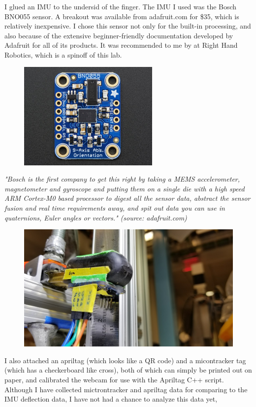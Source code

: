 \documentclass[preprint,12pt,3p]{elsarticle}
\begin{document}
I glued an IMU to the undersid of the finger. The IMU I used was the Bosch BNO055 sensor. A breakout
was available from adafruit.com for \$35, which is relatively inexpensive.  I chose this sensor not
only for the built-in processing, and also because of the extensive beginner-friendly documentation
developed by Adafruit for all of its products. It was recommended to me by 
at Right Hand Robotics, which is a spinoff of this lab.

\begin{figure}[H]
\centering
\includegraphics[width=.3\textwidth]{images/setup/bno055.png}
\end{figure}

\textit{"Bosch is the first company to get this right by taking a MEMS accelerometer, magnetometer and
    gyroscope and putting them on a single die with a high speed ARM Cortex-M0 based processor to digest
    all the sensor data, abstract the sensor fusion and real time requirements away, and spit out data
you can use in quaternions, Euler angles or vectors." (source: adafruit.com)}

\begin{figure}[H]
\centering
\includegraphics[width=.5\textwidth]{images/setup/IMU.jpg}
\end{figure}

I also attached an apriltag (which looks like a QR code) and a micontracker tag (which has a
checkerboard like cross), both of which can simply be printed out on paper, and calibrated the
webcam for use with the Apriltag C++ script. Although I have collected mictrontracker and apriltag
data for comparing to the IMU deflection data, I have not had a chance to analyze this data yet,
\end{document}
